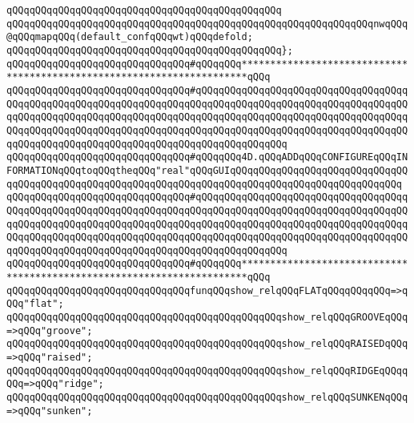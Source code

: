 \verb|qQQqqQQqqQQqqQQqqQQqqQQqqQQqqQQqqQQqqQQqqQQqqQQq|\newline
\verb|qQQqqQQqqQQqqQQqqQQqqQQqqQQqqQQqqQQqqQQqqQQqqQQqqQQqqQQqqQQqqQQqnwqQQq@qQQqmapqQQq(default_confqQQqwt)qQQqdefold;|\newline
\verb|qQQqqQQqqQQqqQQqqQQqqQQqqQQqqQQqqQQqqQQqqQQqqQQq};|\newline
\newline
\newline
\verb|qQQqqQQqqQQqqQQqqQQqqQQqqQQqqQQq#qQQqqQQq***********************************************************************qQQq|\newline
\verb|qQQqqQQqqQQqqQQqqQQqqQQqqQQqqQQq#qQQqqQQqqQQqqQQqqQQqqQQqqQQqqQQqqQQqqQQqqQQqqQQqqQQqqQQqqQQqqQQqqQQqqQQqqQQqqQQqqQQqqQQqqQQqqQQqqQQqqQQqqQQqqQQqqQQqqQQqqQQqqQQqqQQqqQQqqQQqqQQqqQQqqQQqqQQqqQQqqQQqqQQqqQQqqQQqqQQqqQQqqQQqqQQqqQQqqQQqqQQqqQQqqQQqqQQqqQQqqQQqqQQqqQQqqQQqqQQqqQQqqQQqqQQqqQQqqQQqqQQqqQQqqQQqqQQqqQQqqQQqqQQqqQQqqQQq|\newline
\verb|qQQqqQQqqQQqqQQqqQQqqQQqqQQqqQQq#qQQqqQQq4D.qQQqADDqQQqCONFIGUREqQQqINFORMATIONqQQqtoqQQqtheqQQq"real"qQQqGUIqQQqqQQqqQQqqQQqqQQqqQQqqQQqqQQqqQQqqQQqqQQqqQQqqQQqqQQqqQQqqQQqqQQqqQQqqQQqqQQqqQQqqQQqqQQqqQQqqQQq|\newline
\verb|qQQqqQQqqQQqqQQqqQQqqQQqqQQqqQQq#qQQqqQQqqQQqqQQqqQQqqQQqqQQqqQQqqQQqqQQqqQQqqQQqqQQqqQQqqQQqqQQqqQQqqQQqqQQqqQQqqQQqqQQqqQQqqQQqqQQqqQQqqQQqqQQqqQQqqQQqqQQqqQQqqQQqqQQqqQQqqQQqqQQqqQQqqQQqqQQqqQQqqQQqqQQqqQQqqQQqqQQqqQQqqQQqqQQqqQQqqQQqqQQqqQQqqQQqqQQqqQQqqQQqqQQqqQQqqQQqqQQqqQQqqQQqqQQqqQQqqQQqqQQqqQQqqQQqqQQqqQQqqQQqqQQqqQQq|\newline
\verb|qQQqqQQqqQQqqQQqqQQqqQQqqQQqqQQq#qQQqqQQq***********************************************************************qQQq|\newline
\newline
\verb|qQQqqQQqqQQqqQQqqQQqqQQqqQQqqQQqfunqQQqshow_relqQQqFLATqQQqqQQqqQQq=>qQQq"flat";|\newline
\verb|qQQqqQQqqQQqqQQqqQQqqQQqqQQqqQQqqQQqqQQqqQQqqQQqshow_relqQQqGROOVEqQQq=>qQQq"groove";|\newline
\verb|qQQqqQQqqQQqqQQqqQQqqQQqqQQqqQQqqQQqqQQqqQQqqQQqshow_relqQQqRAISEDqQQq=>qQQq"raised";|\newline
\verb|qQQqqQQqqQQqqQQqqQQqqQQqqQQqqQQqqQQqqQQqqQQqqQQqshow_relqQQqRIDGEqQQqqQQq=>qQQq"ridge";|\newline
\verb|qQQqqQQqqQQqqQQqqQQqqQQqqQQqqQQqqQQqqQQqqQQqqQQqshow_relqQQqSUNKENqQQq=>qQQq"sunken";|\newline
